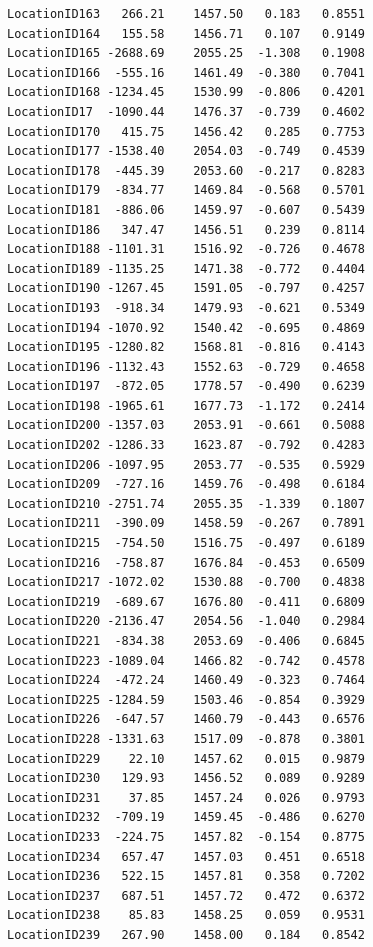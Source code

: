 \documentclass[12pt,twoside]{reedthesis}
\theoremstyle{definition}
\theoremstyle{definition}
\theoremstyle{definition}
\theoremstyle{remark}
\begin{document}
\begin{verbatim}
LocationID163   266.21    1457.50   0.183   0.8551    
LocationID164   155.58    1456.71   0.107   0.9149    
LocationID165 -2688.69    2055.25  -1.308   0.1908    
LocationID166  -555.16    1461.49  -0.380   0.7041    
LocationID168 -1234.45    1530.99  -0.806   0.4201    
LocationID17  -1090.44    1476.37  -0.739   0.4602    
LocationID170   415.75    1456.42   0.285   0.7753    
LocationID177 -1538.40    2054.03  -0.749   0.4539    
LocationID178  -445.39    2053.60  -0.217   0.8283    
LocationID179  -834.77    1469.84  -0.568   0.5701    
LocationID181  -886.06    1459.97  -0.607   0.5439    
LocationID186   347.47    1456.51   0.239   0.8114    
LocationID188 -1101.31    1516.92  -0.726   0.4678    
LocationID189 -1135.25    1471.38  -0.772   0.4404    
LocationID190 -1267.45    1591.05  -0.797   0.4257    
LocationID193  -918.34    1479.93  -0.621   0.5349    
LocationID194 -1070.92    1540.42  -0.695   0.4869    
LocationID195 -1280.82    1568.81  -0.816   0.4143    
LocationID196 -1132.43    1552.63  -0.729   0.4658    
LocationID197  -872.05    1778.57  -0.490   0.6239    
LocationID198 -1965.61    1677.73  -1.172   0.2414    
LocationID200 -1357.03    2053.91  -0.661   0.5088    
LocationID202 -1286.33    1623.87  -0.792   0.4283    
LocationID206 -1097.95    2053.77  -0.535   0.5929    
LocationID209  -727.16    1459.76  -0.498   0.6184    
LocationID210 -2751.74    2055.35  -1.339   0.1807    
LocationID211  -390.09    1458.59  -0.267   0.7891    
LocationID215  -754.50    1516.75  -0.497   0.6189    
LocationID216  -758.87    1676.84  -0.453   0.6509    
LocationID217 -1072.02    1530.88  -0.700   0.4838    
LocationID219  -689.67    1676.80  -0.411   0.6809    
LocationID220 -2136.47    2054.56  -1.040   0.2984    
LocationID221  -834.38    2053.69  -0.406   0.6845    
LocationID223 -1089.04    1466.82  -0.742   0.4578    
LocationID224  -472.24    1460.49  -0.323   0.7464    
LocationID225 -1284.59    1503.46  -0.854   0.3929    
LocationID226  -647.57    1460.79  -0.443   0.6576    
LocationID228 -1331.63    1517.09  -0.878   0.3801    
LocationID229    22.10    1457.62   0.015   0.9879    
LocationID230   129.93    1456.52   0.089   0.9289    
LocationID231    37.85    1457.24   0.026   0.9793    
LocationID232  -709.19    1459.45  -0.486   0.6270    
LocationID233  -224.75    1457.82  -0.154   0.8775    
LocationID234   657.47    1457.03   0.451   0.6518    
LocationID236   522.15    1457.81   0.358   0.7202    
LocationID237   687.51    1457.72   0.472   0.6372    
LocationID238    85.83    1458.25   0.059   0.9531    
LocationID239   267.90    1458.00   0.184   0.8542    

\end{verbatim}
\end{document}
